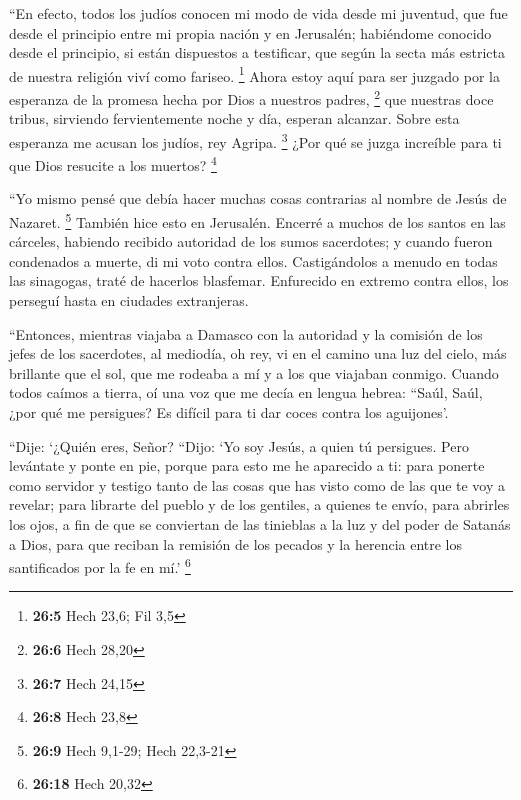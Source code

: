  ``En efecto, todos los judíos conocen mi modo de vida
desde mi juventud, que fue desde el principio entre mi propia nación y
en Jerusalén;  habiéndome conocido desde el principio, si
están dispuestos a testificar, que según la secta más estricta de
nuestra religión viví como fariseo. \footnote{\textbf{26:5} Hech 23,6;
  Fil 3,5}  Ahora estoy aquí para ser juzgado por la
esperanza de la promesa hecha por Dios a nuestros padres, \footnote{\textbf{26:6}
  Hech 28,20}  que nuestras doce tribus, sirviendo
fervientemente noche y día, esperan alcanzar. Sobre esta esperanza me
acusan los judíos, rey Agripa. \footnote{\textbf{26:7} Hech 24,15}
 ¿Por qué se juzga increíble para ti que Dios resucite a
los muertos? \footnote{\textbf{26:8} Hech 23,8}

 ``Yo mismo pensé que debía hacer muchas cosas contrarias
al nombre de Jesús de Nazaret. \footnote{\textbf{26:9} Hech 9,1-29; Hech
  22,3-21}  También hice esto en Jerusalén. Encerré a
muchos de los santos en las cárceles, habiendo recibido autoridad de los
sumos sacerdotes; y cuando fueron condenados a muerte, di mi voto contra
ellos.  Castigándolos a menudo en todas las sinagogas,
traté de hacerlos blasfemar. Enfurecido en extremo contra ellos, los
perseguí hasta en ciudades extranjeras.

 ``Entonces, mientras viajaba a Damasco con la autoridad
y la comisión de los jefes de los sacerdotes,  al
mediodía, oh rey, vi en el camino una luz del cielo, más brillante que
el sol, que me rodeaba a mí y a los que viajaban conmigo.
 Cuando todos caímos a tierra, oí una voz que me decía en
lengua hebrea: ``Saúl, Saúl, ¿por qué me persigues? Es difícil para ti
dar coces contra los aguijones'.

 ``Dije: `¿Quién eres, Señor? ``Dijo: `Yo soy Jesús, a
quien tú persigues.  Pero levántate y ponte en pie,
porque para esto me he aparecido a ti: para ponerte como servidor y
testigo tanto de las cosas que has visto como de las que te voy a
revelar;  para librarte del pueblo y de los gentiles, a
quienes te envío,  para abrirles los ojos, a fin de que
se conviertan de las tinieblas a la luz y del poder de Satanás a Dios,
para que reciban la remisión de los pecados y la herencia entre los
santificados por la fe en mí.' \footnote{\textbf{26:18} Hech 20,32}

